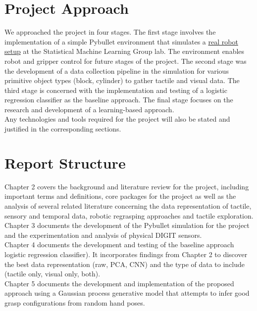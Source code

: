 \documentclass[12pt, a4paper]{report}
\theoremstyle{definition}
\begin{document}
\section{Project Approach}
\label{sec:1.3}
We approached the project in four stages. The first stage involves the implementation of a simple Pybullet environment that simulates a \hyperref[sec:]{real robot setup} at the Statistical Machine Learning Group lab. The environment enables robot and gripper control for future stages of the project. The second stage was the development of a data collection pipeline in the simulation for various primitive object types (block, cylinder) to gather tactile and visual data. The third stage is concerned with the implementation and testing of a logistic regression classifier as the baseline approach. The final stage focuses on the research and development of a learning-based approach.\\

Any technologies and tools required for the project will also be stated and justified in the corresponding sections.

\section{Report Structure}
\label{sec:1.4}
Chapter 2 covers the background and literature review for the project, including important terms and definitions, core packages for the project as well as the analysis of several related literature concerning the data representation of tactile, sensory and temporal data, robotic regrasping approaches and tactile exploration.\\

Chapter 3 documents the development of the Pybullet simulation for the project and the experimentation and analysis of physical DIGIT sensors.\\

Chapter 4 documents the development and testing of the baseline approach logistic regression classifier). It incorporates findings from Chapter 2 to discover the best data representation (raw, PCA, CNN) and the type of data to include (tactile only, visual only, both).\\

Chapter 5 documents the development and implementation of the proposed approach using a Gaussian process generative model that attempts to infer good grasp configurations from random hand poses.\\
\end{document}
